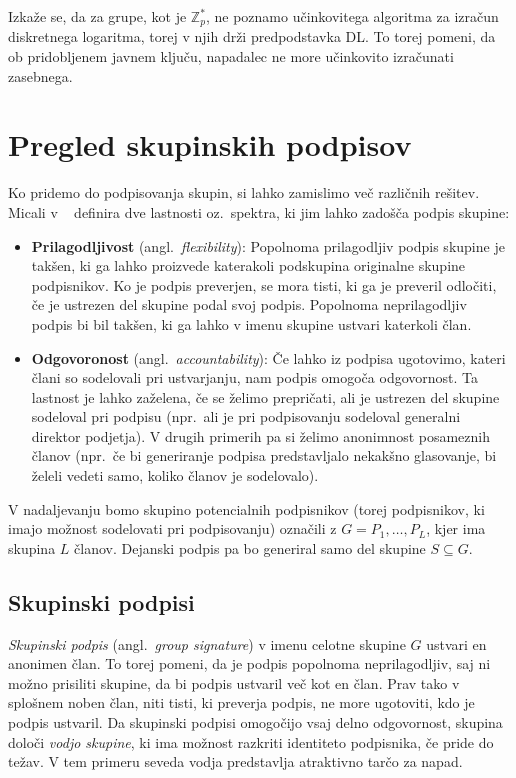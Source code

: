 \documentclass[isrm2, tisk]{fmfdelo}
\newcommand{\Z}{\mathbb Z}
\begin{document}
Izkaže se, da za grupe, kot je $\Z_p^*$, ne poznamo učinkovitega algoritma za izračun diskretnega 
logaritma, torej v njih drži predpodstavka DL. To torej pomeni, da ob pridobljenem javnem ključu, 
napadalec ne more učinkovito izračunati zasebnega.

\section{Pregled skupinskih podpisov}
Ko pridemo do podpisovanja skupin, si lahko zamislimo več različnih rešitev. Micali v ~\cite{micali2001asm} 
definira dve lastnosti oz.\ spektra, ki jim lahko zadošča podpis skupine:
\begin{itemize}
    \item \textbf{Prilagodljivost} (angl.\ \textit{flexibility}): Popolnoma prilagodljiv podpis skupine
        je takšen, ki ga lahko proizvede katerakoli podskupina originalne skupine podpisnikov. Ko je podpis 
        preverjen, se mora tisti, ki ga je preveril odločiti, če je ustrezen del skupine podal svoj podpis. 
        Popolnoma neprilagodljiv podpis bi bil takšen, ki ga lahko v imenu skupine ustvari katerkoli član.
    \item \textbf{Odgovoronost} (angl.\ \textit{accountability}): Če lahko iz podpisa ugotovimo, kateri člani 
        so sodelovali pri ustvarjanju, nam podpis omogoča odgovornost. Ta lastnost je lahko zaželena, če 
        se želimo prepričati, ali je ustrezen del skupine sodeloval pri podpisu (npr.\ ali je pri podpisovanju 
        sodeloval generalni direktor podjetja). V drugih primerih pa si želimo anonimnost posameznih članov 
        (npr.\ če bi generiranje podpisa predstavljalo nekakšno glasovanje, bi želeli vedeti samo, koliko 
        članov je sodelovalo).
\end{itemize}

V nadaljevanju bomo skupino potencialnih podpisnikov (torej podpisnikov, ki imajo možnost sodelovati pri 
podpisovanju) označili z $G = P_1, \dots, P_L$, kjer ima skupina $L$ članov. Dejanski podpis pa bo 
generiral samo del skupine $S \subseteq G$.

\subsection{Skupinski podpisi}
\textit{Skupinski podpis} (angl.\ \textit{group signature}) v imenu celotne skupine $G$ ustvari en 
anonimen član. To torej pomeni, da je podpis popolnoma neprilagodljiv, saj ni možno prisiliti skupine,
da bi podpis ustvaril več kot en član. Prav tako v splošnem noben član, niti tisti, ki preverja podpis,
ne more ugotoviti, kdo je podpis ustvaril. Da skupinski podpisi omogočijo vsaj delno odgovornost, 
skupina določi \textit{vodjo skupine}, ki ima možnost razkriti identiteto podpisnika, če pride do 
težav. V tem primeru seveda vodja predstavlja atraktivno tarčo za napad.
\end{document}
